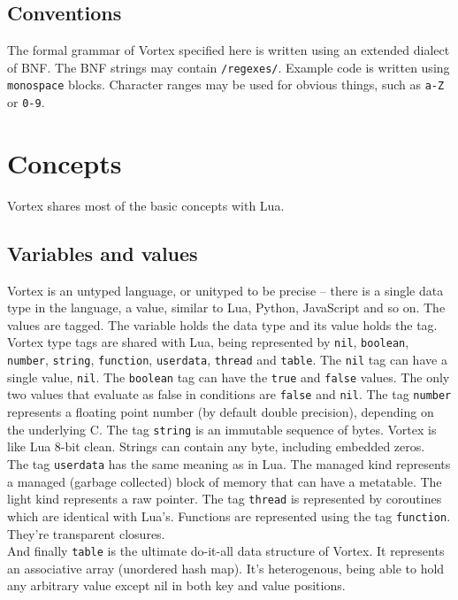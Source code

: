 \documentclass{article}
\begin{document}
\subsection{Conventions}
The formal grammar of Vortex specified here is written using an extended
dialect of BNF. The BNF strings may contain \verb|/regexes/|. Example code is
written using \verb|monospace| blocks. Character ranges may be used for obvious
things, such as \verb|a-Z| or \verb|0-9|.

\section{Concepts}
Vortex shares most of the basic concepts with Lua.
\subsection{Variables and values}
Vortex is an untyped language, or unityped to be precise -- there is a single
data type in the language, a value, similar to Lua, Python, JavaScript and
so on. The values are tagged. The variable holds the data type and its value
holds the tag.\\
Vortex type tags are shared with Lua, being represented by \verb|nil|,
\verb|boolean|, \verb|number|, \verb|string|, \verb|function|,
\verb|userdata|, \verb|thread| and \verb|table|. The \verb|nil| tag can have
a single value, \verb|nil|. The \verb|boolean| tag can have the \verb|true|
and \verb|false| values. The only two values that evaluate as false in
conditions are \verb|false| and \verb|nil|. The tag \verb|number| represents
a floating point number (by default double precision), depending on the
underlying C. The tag \verb|string| is an immutable sequence of bytes.
Vortex is like Lua 8-bit clean. Strings can contain any byte, including
embedded zeros.\\
The tag \verb|userdata| has the same meaning as in Lua. The managed kind
represents a managed (garbage collected) block of memory that can have
a metatable. The light kind represents a raw pointer. The tag \verb|thread|
is represented by coroutines which are identical with Lua's. Functions are
represented using the tag \verb|function|. They're transparent closures.\\
And finally \verb|table| is the ultimate do-it-all data structure of Vortex.
It represents an associative array (unordered hash map). It's heterogenous,
being able to hold any arbitrary value except nil in both key and value
positions.\\
\end{document}

